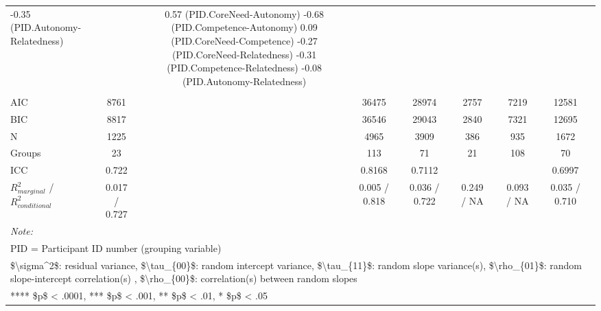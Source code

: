 \begin{table}
\begin{minipage}[t][\textheight][t]{\textwidth}
{\begin{tabular}[t]{lcccccccccccc}
-0.35 (PID.Autonomy-Relatedness) &  & 0.57 (PID.CoreNeed-Autonomy)
-0.68 (PID.Competence-Autonomy)
 0.09 (PID.CoreNeed-Competence)
-0.27 (PID.CoreNeed-Relatedness)
-0.31 (PID.Competence-Relatedness)
\hspace{1em}-0.08 (PID.Autonomy-Relatedness) & \\
\addlinespace[0.3em]
\multicolumn{13}{l}{\textbf{Fit}}\\
\hspace{1em}AIC & 8761 &  & 36475 &  & 28974 &  & 2757 &  & 7219 &  & 12581 & \\
\hspace{1em}BIC & 8817 &  & 36546 &  & 29043 &  & 2840 &  & 7321 &  & 12695 & \\
\hspace{1em}N & 1225 &  & 4965 &  & 3909 &  & 386 &  & 935 &  & 1672 & \\
\hspace{1em}Groups & 23 &  & 113 &  & 71 &  & 21 &  & 108 &  & 70 & \\
\hspace{1em}ICC & 0.722 &  & 0.8168 &  & 0.7112 &  &  &  &  &  & 0.6997 & \\
\hspace{1em}$R^2_{marginal}$ / $R^2_{conditional}$ & 0.017 / 0.727 &  & 0.005 / 0.818 &  & 0.036 / 0.722 &  & 0.249 / NA &  & 0.093 / NA &  & 0.035 / 0.710 & \\
\bottomrule
\multicolumn{13}{l}{\rule{0pt}{1em}\textit{Note: }}\\
\multicolumn{13}{l}{\rule{0pt}{1em}PID = Participant ID number (grouping variable)}\\
\multicolumn{13}{l}{\rule{0pt}{1em}\$\textbackslash{}sigma\textasciicircum{}2\$: residual variance, \$\textbackslash{}tau\_\{00\}\$: random intercept variance, \$\textbackslash{}tau\_\{11\}\$: random slope variance(s), \$\textbackslash{}rho\_\{01\}\$: random slope-intercept correlation(s) , \$\textbackslash{}rho\_\{00\}\$: correlation(s) between random slopes}\\
\multicolumn{13}{l}{\rule{0pt}{1em}**** \$p\$ < .0001, *** \$p\$ < .001, ** \$p\$ < .01, * \$p\$ < .05}\\
\end{tabular}}
\end{minipage}
\end{table}
